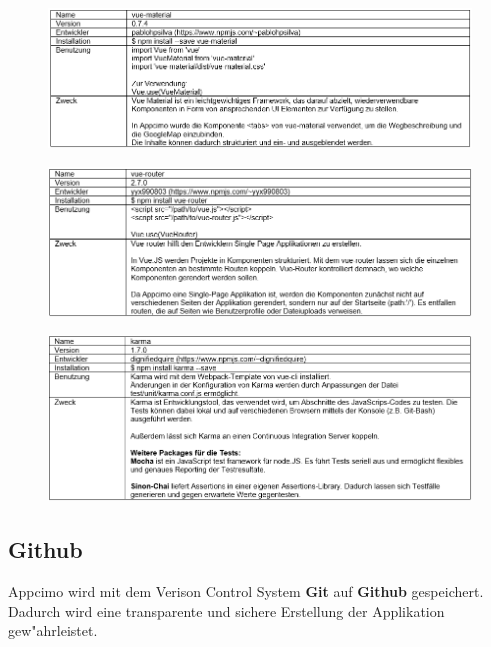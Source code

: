 \documentclass[a4paper, 11pt]{scrreprt}
\begin{document}
\begin{figure} [H]
\begin{center}
\includegraphics[scale=0.7]{package4.png}
\label{vue-material}
\end{center}
\end{figure}

\begin{figure} [H]
\begin{center}
\includegraphics[scale=0.7]{package5.png}
\label{vue-router}
\end{center}
\end{figure}

\begin{figure} [H]
\begin{center}
\includegraphics[scale=0.7]{package6.png}
\label{karma}
\end{center}
\end{figure}




\subsection{Github}
Appcimo wird mit dem Verison Control System \textbf{Git} auf \textbf{Github} gespeichert.
Dadurch wird eine transparente und sichere Erstellung der Applikation gew"ahrleistet. \\
\end{document}

